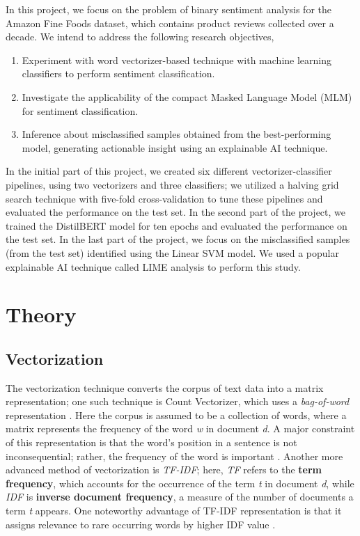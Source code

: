 \documentclass[11pt]{article}
\begin{document}
In this project, we focus on the problem of binary sentiment analysis for the Amazon Fine Foods dataset, which contains product reviews collected over a decade. We intend to address the following research objectives,
\begin{enumerate}
    \item Experiment with word vectorizer-based technique with machine learning classifiers to perform sentiment classification.
    
    \item Investigate the applicability of the compact Masked Language Model (MLM) for sentiment classification.
    
    \item Inference about misclassified samples obtained from the best-performing model, generating actionable insight using an explainable AI technique.
\end{enumerate}
In the initial part of this project, we created six different vectorizer-classifier pipelines, using two vectorizers and three classifiers; we utilized a halving grid search technique with five-fold cross-validation to tune these pipelines and evaluated the performance on the test set. In the second part of the project, we trained the DistilBERT model for ten epochs and evaluated the performance on the test set. 
In the last part of the project, we focus on the misclassified samples (from the test set) identified using the Linear SVM model. We used a popular explainable AI technique called LIME analysis \cite{LIME} to perform this study.

 \section{Theory}
\subsection{Vectorization}
The vectorization technique converts the corpus of text data into a matrix representation; one such technique is Count Vectorizer, which uses a \textit{bag-of-word} representation \cite{jurafsky}. Here the corpus is assumed to be a collection of words, where a matrix represents the frequency of the word \textit{w} in document \textit{d}. A major  constraint of this representation is that the word's position in a sentence is not inconsequential; rather, the frequency of the word is important \cite{jurafsky}. 
Another more advanced method of vectorization is \textit{TF-IDF}; here, \textit{TF} refers to the \textbf{term frequency}, which accounts for the occurrence of the term \textit{t} in document \textit{d}, while \textit{IDF} is \textbf{inverse document frequency}, a measure of the number of documents a term \textit{t} appears. One noteworthy advantage of TF-IDF representation is that it assigns relevance to rare occurring words by higher IDF value \cite{info-ret}.
\end{document}
